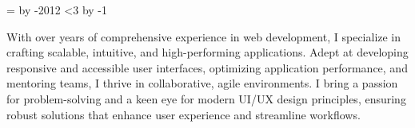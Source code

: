 %
%
%
\newcount\yearsofexperience
\yearsofexperience=\year
\advance\yearsofexperience by -2012
\ifnum\month<3
  \advance\yearsofexperience by -1
\fi

\par{
With over \the\yearsofexperience{} years of comprehensive experience in web development, I specialize in crafting scalable, intuitive, and high-performing applications. Adept at developing responsive and accessible user interfaces, optimizing application performance, and mentoring teams, I thrive in collaborative, agile environments. I bring a passion for problem-solving and a keen eye for modern UI/UX design principles, ensuring robust solutions that enhance user experience and streamline workflows.
}

